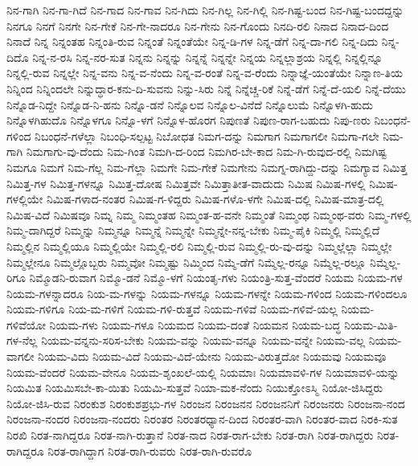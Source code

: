 {ನಿನ-ಗಾಗಿ
ನಿನ-ಗಾ-ಗಿದೆ
ನಿನ-ಗಾದ
ನಿನ-ಗಾವ
ನಿನ-ಗಿದು
ನಿನ-ಗಿಲ್ಲ
ನಿನ-ಗಿಲ್ಲಿ
ನಿನ-ಗಿಷ್ಟ-ಬಂದ
ನಿನ-ಗಿಷ್ಟ-ಬಂದದ್ದನ್ನು
ನಿನಗೂ
ನಿನಗೆ
ನಿನಗೇ
ನಿನ-ಗೇಕೆ
ನಿನ-ಗೇ-ನಾದರೂ
ನಿನ-ಗೇನು
ನಿನ-ಗೊಂದು
ನಿನದಿ-ರಲಿ
ನಿನಾದ
ನಿನಾದ-ದಿಂದ
ನಿನಾದೆ
ನಿನ್ನ
ನಿನ್ನಂತಹ
ನಿನ್ನಂತಿ-ರುವ
ನಿನ್ನಂತೆ
ನಿನ್ನಂತೆಯೇ
ನಿನ್ನ-ಡಿ-ಗಳ
ನಿನ್ನ-ಡೆಗೆ
ನಿನ್ನ-ದಾ-ಗಲಿ
ನಿನ್ನ-ದಿದು
ನಿನ್ನ-ದಿದೊ
ನಿನ್ನ-ನ-ರಸಿ
ನಿನ್ನ-ನರ-ಸುತ
ನಿನ್ನನು
ನಿನ್ನನ್ನು
ನಿನ್ನನ್ನೆ
ನಿನ್ನನ್ನೇ
ನಿನ್ನಯ
ನಿನ್ನಲ್ಲಾಶ್ರಯ
ನಿನ್ನಲ್ಲಿ
ನಿನ್ನಲ್ಲಿನ್ನೂ
ನಿನ್ನಲ್ಲಿ-ರುವ
ನಿನ್ನಲ್ಲೇ
ನಿನ್ನ-ವನು
ನಿನ್ನ-ವ-ನೆಂದು
ನಿನ್ನ-ವ-ರಂತೆ
ನಿನ್ನ-ವ-ರೆಂದು
ನಿನ್ನಾಜ್ಞೆ-ಯಂತೆಯೇ
ನಿನ್ನಾಣ-ತಿಯ
ನಿನ್ನಿಂದ
ನಿನ್ನಿಂದಲೇ
ನಿನ್ನುದ್ಧಾರ-ಕನು-ದಿ-ಸುವನು
ನಿನ್ನು-ಸಿರು
ನಿನ್ನೆ
ನಿನ್ನೆಚ್ಚ-ರಿಕೆ
ನಿನ್ನೆ-ಡೆಗೆ
ನಿನ್ನೆ-ದೆ-ಯಲಿ
ನಿನ್ನೆ-ದೆಯು
ನಿನ್ನೊಡ-ನಿದ್ದೇ
ನಿನ್ನೊಡ-ನಿ-ಹನು
ನಿನ್ನೊ-ಡನೆ
ನಿನ್ನೊಲವ
ನಿನ್ನೊಲ-ವಿನೆದೆ
ನಿನ್ನೊಲುಮೆ
ನಿನ್ನೊಳಗಿ-ಹುದು
ನಿನ್ನೊಳಗಿಹುದೊ
ನಿನ್ನೊಳಗೂ
ನಿನ್ನೊ-ಳಗೆ
ನಿನ್ನೊಳ-ಹೊರಗ
ನಿಪುಣತೆ
ನಿಪುಣ-ರಾಗ-ಬಹುದು
ನಿಪು-ಣರು
ನಿಬಂಧನೆ-ಗಳಿಂದ
ನಿಬಂಧನೆ-ಗಳೆಲ್ಲಾ
ನಿಬಂಧಿ-ಸಲ್ಪಟ್ಟ
ನಿಬೋಧತ
ನಿಮಗ-ದನ್ನು
ನಿಮಗಾಗ
ನಿಮಗಾಗಲೀ
ನಿಮಗಾ-ಗಲೇ
ನಿಮ-ಗಾಗಿ
ನಿಮಗಾಗು-ವು-ದೆಂದು
ನಿಮ-ಗಿಂತ
ನಿಮಗಿ-ದ-ರಿಂದ
ನಿಮಗಿರ-ಬೇ-ಕಾದ
ನಿಮ-ಗಿ-ರುವುದ-ರಲ್ಲಿ
ನಿಮಗಿಷ್ಟ
ನಿಮಗೂ
ನಿಮಗೆ
ನಿಮ-ಗೆಲ್ಲ
ನಿಮ-ಗೆಲ್ಲಾ
ನಿಮಗೇ
ನಿಮ-ಗೇಕೆ
ನಿಮಗೇನು
ನಿಮಗ್ನ-ರಾಗಿದ್ದು-ದನ್ನು
ನಿಮಗ್ಯಾವ
ನಿಮಿತ್ತ
ನಿಮಿತ್ತ-ಗಳ
ನಿಮಿತ್ತ-ಗಳನ್ನೂ
ನಿಮಿತ್ತ-ದೋಷ
ನಿಮಿತ್ತವೇ
ನಿಮಿತ್ತಾತೀತ-ವಾದುದು
ನಿಮಿಷ
ನಿಮಿಷ-ಗಳಲ್ಲಿ
ನಿಮಿಷ-ಗಳಲ್ಲಿಯೇ
ನಿಮಿಷ-ಗಳಾದ-ನಂತರ
ನಿಮಿಷ-ಗ-ಳಿದ್ದರು
ನಿಮಿಷ-ಗಳೊ-ಳಗೇ
ನಿಮಿಷ-ದಲ್ಲಿ
ನಿಮಿಷ-ಮಾತ್ರ-ದಲ್ಲಿ
ನಿಮಿಷ-ವಿದೆ
ನಿಮಿಷವೂ
ನಿಮ್ನ
ನಿಮ್ಮ
ನಿಮ್ಮಂತಹ
ನಿಮ್ಮಂತ-ಹ-ವನೇ
ನಿಮ್ಮಂತೆ
ನಿಮ್ಮಂಥ
ನಿಮ್ಮಂಥ-ವರು
ನಿಮ್ಮ-ಗಳಲ್ಲಿ
ನಿಮ್ಮ-ದಾಗಿದ್ದರೆ
ನಿಮ್ಮನ್ನು
ನಿಮ್ಮನ್ನೂ
ನಿಮ್ಮನ್ನೆ
ನಿಮ್ಮನ್ನೇ
ನಿಮ್ಮನ್ನೇ-ನನ್ನ-ಬೇಕು
ನಿಮ್ಮ-ಪೈಕಿ
ನಿಮ್ಮಲ್ಲಿ
ನಿಮ್ಮಲ್ಲಿದೆ
ನಿಮ್ಮಲ್ಲಿನ
ನಿಮ್ಮಲ್ಲಿಯೂ
ನಿಮ್ಮಲ್ಲಿಯೇ
ನಿಮ್ಮಲ್ಲಿ-ರಲಿ
ನಿಮ್ಮಲ್ಲಿ-ರುವ
ನಿಮ್ಮಲ್ಲಿ-ರು-ವು-ದನ್ನು
ನಿಮ್ಮಲ್ಲೆಲ್ಲಾ
ನಿಮ್ಮಲ್ಲೇ
ನಿಮ್ಮಲ್ಲೇನೂ
ನಿಮ್ಮಲ್ಲೊಬ್ಬರು
ನಿಮ್ಮವೋ
ನಿಮ್ಮಷ್ಟು
ನಿಮ್ಮಿಂದ
ನಿಮ್ಮೆ-ಡೆಗೆ
ನಿಮ್ಮೆಲ್ಲ-ರನ್ನೂ
ನಿಮ್ಮೆಲ್ಲ-ರಲ್ಲೂ
ನಿಮ್ಮೆಲ್ಲ-ರಿಗೂ
ನಿಮ್ಮೊಡನಿ-ರುವಾಗ
ನಿಮ್ಮೊ-ಡನೆ
ನಿಮ್ಮೊ-ಳಗೆ
ನಿಯಂತೃ-ಗಳು
ನಿಯಂತ್ರಿ-ಸುತ್ತ-ವೆಂದರೆ
ನಿಯಮ
ನಿಯಮ-ಗಳ
ನಿಯಮ-ಗಳನ್ನಾದರೂ
ನಿಯ-ಮ-ಗಳನ್ನು
ನಿಯಮ-ಗಳನ್ನೂ
ನಿಯಮ-ಗಳನ್ನೇ
ನಿಯಮ-ಗಳಿಂದ
ನಿಯಮ-ಗಳಿಂದಲೂ
ನಿಯಮ-ಗಳಿಗೂ
ನಿಯ-ಮ-ಗಳಿಗೆ
ನಿಯಮ-ಗಳಿ-ರುತ್ತವೆ
ನಿಯಮ-ಗಳಿವೆ
ನಿಯಮ-ಗಳಿವೆ-ಯಲ್ಲ
ನಿಯಮ-ಗಳಿವೆಯೋ
ನಿಯಮ-ಗಳು
ನಿಯಮ-ಗಳೂ
ನಿಯಮದ
ನಿಯಮ-ದಂತೆ
ನಿಯಮನ
ನಿಯಮ-ಬದ್ಧ
ನಿಯಮ-ಮಿತಿ-ಗಳ-ನೆಲ್ಲ
ನಿಯಮ-ವನ್ನನು-ಸರಿಸ-ಬೇಕು
ನಿಯಮ-ವನ್ನು
ನಿಯಮ-ವನ್ನೂ
ನಿಯಮ-ವನ್ನೇ
ನಿಯಮ-ವಲ್ಲ
ನಿಯಮ-ವಾಗಲೀ
ನಿಯಮ-ವಿದು
ನಿಯಮ-ವಿದೆ
ನಿಯಮ-ವಿದೆ-ಯೇನು
ನಿಯಮ-ವಿರುತ್ತದೋ
ನಿಯಮವು
ನಿಯಮವೂ
ನಿಯಮ-ವೆಂದರೆ
ನಿಯಮ-ವೇನೂ
ನಿಯಮ-ಶೃಂಖಲೆ-ಯಲ್ಲಿ
ನಿಯಮಾಃ
ನಿಯಮಾವಳಿ-ಗಳ
ನಿಯಮಾವಳಿ-ಯನ್ನು
ನಿಯಮಿತ
ನಿಯಮಿಸಬೇ-ಕಾ-ಯಿತು
ನಿಯಮಿ-ಸುತ್ತವೆ
ನಿಯಾ-ಮಕ-ನೆಂದು
ನಿಯುಕ್ತೋಽಸ್ಮಿ
ನಿಯೋ-ಜಿಸಿದ್ದರು
ನಿಯೋ-ಜಿಸಿ-ರುವ
ನಿರಂಕುಶ
ನಿರಂಕುಶಪ್ರಭು-ಗಳ
ನಿರಂಜನ
ನಿರಂಜನನ
ನಿರಂಜನನಿಗೆ
ನಿರಂಜನರು
ನಿರಂಜನಾ-ನಂದ
ನಿರಂಜನಾ-ನಂದರ
ನಿರಂಜನಾ-ನಂದರು
ನಿರಂತರ
ನಿರಂತರಧ್ಯಾನ-ದಿಂದ
ನಿರಂತರ-ವಾಗಿ
ನಿರಂತರ-ವಾದ
ನಿರಕಿ-ಸುತ
ನಿರಖಿ
ನಿರತ-ನಾಗಿದ್ದರೂ
ನಿರತ-ನಾಗಿ-ರುತ್ತಾನೆ
ನಿರತ-ನಾದ
ನಿರತ-ರಾಗ-ಬೇಕು
ನಿರತ-ರಾಗಿ
ನಿರತ-ರಾಗಿದ್ದರು
ನಿರತ-ರಾಗಿದ್ದರೂ
ನಿರತ-ರಾಗಿದ್ದಾಗ
ನಿರತ-ರಾಗಿ-ರುವರು
ನಿರತ-ರಾಗಿ-ರುವರೊ
}
